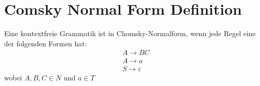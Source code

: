 \documentclass[t]{beamer}
\begin{document}


    \section{Comsky Normal Form Definition}
    \begin{frame}
        Eine kontextfreie Grammatik ist in Chomsky-Normalform, wenn jede Regel eine der folgenden Formen hat:
        \begin{align*}
            & A \rightarrow BC \\
            & A \rightarrow a \\
            & S \rightarrow \varepsilon
        \end{align*}
        wobei $A,B,C \in N$ und $a \in T$
    \end{frame}
\end{document}
